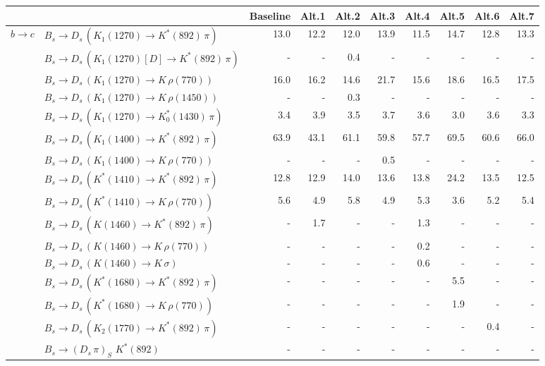 \begin{tabular}{l l  r  r  r  r  r  r  r  r  } 
\hline
\hline
& & \multicolumn{1}{c}{Baseline}  & \multicolumn{1}{c}{Alt.1}  & \multicolumn{1}{c}{Alt.2}  & \multicolumn{1}{c}{Alt.3}  & \multicolumn{1}{c}{Alt.4}  & \multicolumn{1}{c}{Alt.5}  & \multicolumn{1}{c}{Alt.6}  & \multicolumn{1}{c}{Alt.7}  \\ 
\hline
\multirow{28}{*}{$b \to c$}  & $B_s \to D_s \, ( K_1(1270) \to K^{*}(892) \, \pi )$ & 13.0 & 12.2 & 12.0 & 13.9 & 11.5 & 14.7 & 12.8 & 13.3 \\ 
 & $B_s \to D_s \, ( K_1(1270)[D] \to K^{*}(892) \, \pi )$ & -  & -  & 0.4 & -  & -  & -  & -  & -  \\ 
 & $B_s \to D_s \, ( K_1(1270) \to K \, \rho(770) )$ & 16.0 & 16.2 & 14.6 & 21.7 & 15.6 & 18.6 & 16.5 & 17.5 \\ 
 & $B_s \to D_s \, ( K_1(1270) \to K \, \rho(1450) )$ & -  & -  & 0.3 & -  & -  & -  & -  & -  \\ 
 & $B_s \to D_s \, ( K_1(1270) \to K^{*}_{0}(1430) \, \pi )$ & 3.4 & 3.9 & 3.5 & 3.7 & 3.6 & 3.0 & 3.6 & 3.3 \\ 
 & $B_s \to D_s \, ( K_1(1400) \to K^{*}(892) \, \pi )$ & 63.9 & 43.1 & 61.1 & 59.8 & 57.7 & 69.5 & 60.6 & 66.0 \\ 
 & $B_s \to D_s \, ( K_1(1400) \to K \, \rho(770) )$ & -  & -  & -  & 0.5 & -  & -  & -  & -  \\ 
 & $B_s \to D_s \, ( K^{*}(1410) \to K^{*}(892) \, \pi )$ & 12.8 & 12.9 & 14.0 & 13.6 & 13.8 & 24.2 & 13.5 & 12.5 \\ 
 & $B_s \to D_s \, ( K^{*}(1410) \to K \, \rho(770) )$ & 5.6 & 4.9 & 5.8 & 4.9 & 5.3 & 3.6 & 5.2 & 5.4 \\ 
 & $B_s \to D_s \, ( K(1460) \to K^{*}(892) \, \pi )$ & -  & 1.7 & -  & -  & 1.3 & -  & -  & -  \\ 
 & $B_s \to D_s \, ( K(1460) \to K \, \rho(770) )$ & -  & -  & -  & -  & 0.2 & -  & -  & -  \\ 
 & $B_s \to D_s \, ( K(1460) \to K \, \sigma )$ & -  & -  & -  & -  & 0.6 & -  & -  & -  \\ 
 & $B_s \to D_s \, ( K^{*}(1680) \to K^{*}(892) \, \pi )$ & -  & -  & -  & -  & -  & 5.5 & -  & -  \\ 
 & $B_s \to D_s \, ( K^{*}(1680) \to K \, \rho(770) )$ & -  & -  & -  & -  & -  & 1.9 & -  & -  \\ 
 & $B_s \to D_s \, ( K_2(1770) \to K^{*}(892) \, \pi )$ & -  & -  & -  & -  & -  & -  & 0.4 & -  \\ 
 & $B_s \to ( D_s \, \pi)_{S} \, \, K^{*}(892)$ & -  & -  & -  & -  & -  & -  & -  & -  \\ 

\end{tabular}
